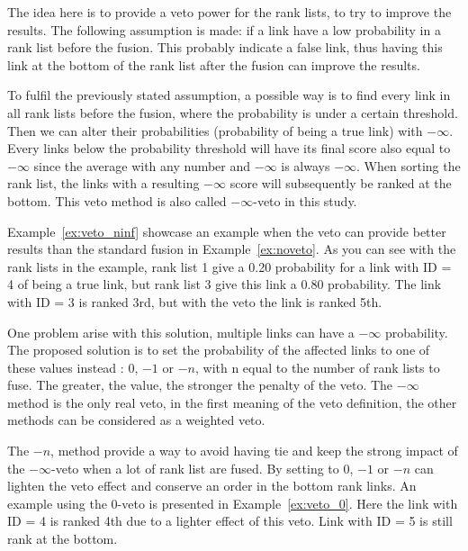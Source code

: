 The idea here is to provide a veto power for the rank lists, to try to improve the results.
The following assumption is made: if a link have a low probability in a rank list before the fusion.
This probably indicate a false link, thus having this link at the bottom of the rank list after the fusion can improve the results.

To fulfil the previously stated assumption, a possible way is to find every link in all rank lists before the fusion, where the probability is under a certain threshold.
Then we can alter their probabilities (probability of being a true link) with $-\infty$.
Every links below the probability threshold will have its final score also equal to $-\infty$ since the average with any number and $-\infty$ is always $-\infty$.
When sorting the rank list, the links with a resulting $-\infty$ score will subsequently be ranked at the bottom.
This veto method is also called $-\infty$-veto in this study.

Example~\ref{ex:veto_ninf} showcase an example when the veto can provide better results than the standard fusion in Example~\ref{ex:noveto}.
As you can see with the rank lists in the example, rank list 1 give a 0.20 probability for a link with ID = 4 of being a true link, but rank list 3 give this link a 0.80 probability.
The link with ID = 3 is ranked 3rd, but with the veto the link is ranked 5th.

One problem arise with this solution, multiple links can have a $-\infty$ probability.
The proposed solution is to set the probability of the affected links to one of these values instead : $0$, $-1$ or $-n$, with n equal to the number of rank lists to fuse.
The greater, the value, the stronger the penalty of the veto.
The $-\infty$ method is the only real veto, in the first meaning of the veto definition, the other methods can be considered as a weighted veto.

The $-n$, method provide a way to avoid having tie and keep the strong impact of the $-\infty$-veto when a lot of rank list are fused.
By setting to $0$, $-1$ or $-n$ can lighten the veto effect and conserve an order in the bottom rank links.
An example using the $0$-veto is presented in Example~\ref{ex:veto_0}.
Here the link with ID = 4 is ranked 4th due to a lighter effect of this veto.
Link with ID = 5 is still rank at the bottom.

